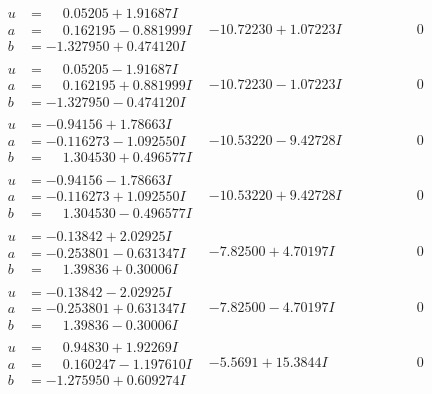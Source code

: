 \documentclass[1p]{elsarticle_modified}
\theoremstyle{definition}
\begin{document}
$$\begin{array}{c|c|c}
\begin{aligned}
u &= \phantom{-}0.05205 + 1.91687 I \\
a &= \phantom{-}0.162195 - 0.881999 I \\
b &= -1.327950 + 0.474120 I\end{aligned}
 & -10.72230 + 1.07223 I & \phantom{-0.000000 } 0 \\ \hline\begin{aligned}
u &= \phantom{-}0.05205 - 1.91687 I \\
a &= \phantom{-}0.162195 + 0.881999 I \\
b &= -1.327950 - 0.474120 I\end{aligned}
 & -10.72230 - 1.07223 I & \phantom{-0.000000 } 0 \\ \hline\begin{aligned}
u &= -0.94156 + 1.78663 I \\
a &= -0.116273 - 1.092550 I \\
b &= \phantom{-}1.304530 + 0.496577 I\end{aligned}
 & -10.53220 - 9.42728 I & \phantom{-0.000000 } 0 \\ \hline\begin{aligned}
u &= -0.94156 - 1.78663 I \\
a &= -0.116273 + 1.092550 I \\
b &= \phantom{-}1.304530 - 0.496577 I\end{aligned}
 & -10.53220 + 9.42728 I & \phantom{-0.000000 } 0 \\ \hline\begin{aligned}
u &= -0.13842 + 2.02925 I \\
a &= -0.253801 - 0.631347 I \\
b &= \phantom{-}1.39836 + 0.30006 I\end{aligned}
 & -7.82500 + 4.70197 I & \phantom{-0.000000 } 0 \\ \hline\begin{aligned}
u &= -0.13842 - 2.02925 I \\
a &= -0.253801 + 0.631347 I \\
b &= \phantom{-}1.39836 - 0.30006 I\end{aligned}
 & -7.82500 - 4.70197 I & \phantom{-0.000000 } 0 \\ \hline\begin{aligned}
u &= \phantom{-}0.94830 + 1.92269 I \\
a &= \phantom{-}0.160247 - 1.197610 I \\
b &= -1.275950 + 0.609274 I\end{aligned}
 & -5.5691 + 15.3844 I & \phantom{-0.000000 } 0 \\ \hline\begin{aligned}

\end{aligned}
\end{array}$$
\end{document}
